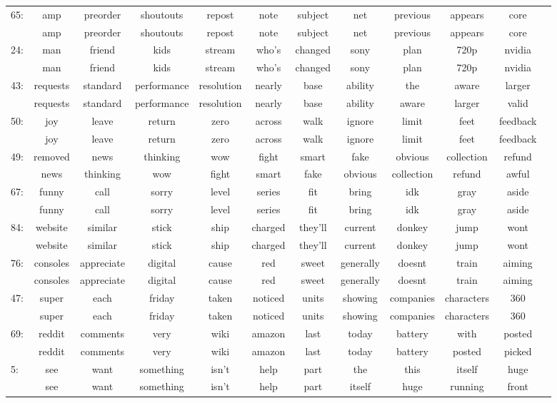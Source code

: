 \documentclass[11pt]{article} %
\begin{document}
\begin{landscape}
\begin{tabular}{|l|c c c c c c c c c c c}
65: &  amp&preorder&shoutouts&repost&note&subject&net&previous&appears&core\\
        & amp&preorder&shoutouts&repost&note&subject&net&previous&appears&core\\
24: &  man&friend&kids&stream&who's&changed&sony&plan&720p&nvidia\\
        & man&friend&kids&stream&who's&changed&sony&plan&720p&nvidia\\
43: &  requests&standard&performance&resolution&nearly&base&ability&the&aware&larger\\
        & requests&standard&performance&resolution&nearly&base&ability&aware&larger&valid\\
50: &  joy&leave&return&zero&across&walk&ignore&limit&feet&feedback\\
        & joy&leave&return&zero&across&walk&ignore&limit&feet&feedback\\
49: &  removed&news&thinking&wow&fight&smart&fake&obvious&collection&refund\\
        & news&thinking&wow&fight&smart&fake&obvious&collection&refund&awful\\
67: &  funny&call&sorry&level&series&fit&bring&idk&gray&aside\\
        & funny&call&sorry&level&series&fit&bring&idk&gray&aside\\
84: &  website&similar&stick&ship&charged&they'll&current&donkey&jump&wont\\
        & website&similar&stick&ship&charged&they'll&current&donkey&jump&wont\\
76: &  consoles&appreciate&digital&cause&red&sweet&generally&doesnt&train&aiming\\
        & consoles&appreciate&digital&cause&red&sweet&generally&doesnt&train&aiming\\
47: &  super&each&friday&taken&noticed&units&showing&companies&characters&360\\
        & super&each&friday&taken&noticed&units&showing&companies&characters&360\\
69: &  reddit&comments&very&wiki&amazon&last&today&battery&with&posted\\
        & reddit&comments&very&wiki&amazon&last&today&battery&posted&picked\\
5: &  see&want&something&isn't&help&part&the&this&itself&huge\\
        & see&want&something&isn't&help&part&itself&huge&running&front\\

\end{tabular}
\end{landscape}
\end{document}
